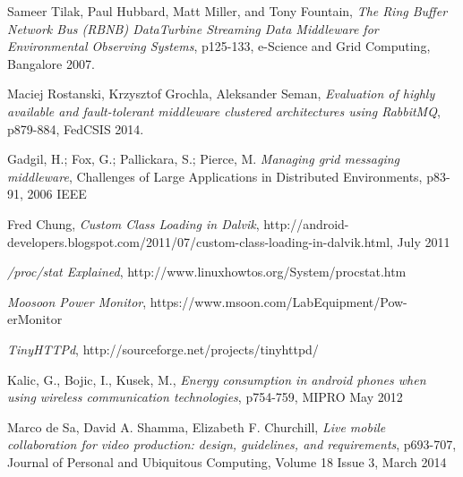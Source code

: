 \documentclass[conference]{IEEEtran}
\begin{document}

%
%
%
\begin{thebibliography}{100}

Sameer Tilak, Paul Hubbard, Matt Miller, and Tony Fountain, \emph{The Ring Buffer Network Bus (RBNB) DataTurbine Streaming Data Middleware for Environmental Observing Systems}, p125-133, e-Science and Grid Computing, Bangalore 2007.

Maciej Rostanski, Krzysztof Grochla, Aleksander Seman, \emph{Evaluation of highly available and fault-tolerant
middleware clustered architectures using RabbitMQ}, p879-884, FedCSIS 2014.

Gadgil, H.; Fox, G.; Pallickara, S.; Pierce, M. \emph{Managing grid messaging middleware}, Challenges of Large Applications in Distributed Environments, p83-91, 2006 IEEE

Fred Chung, \emph{Custom Class Loading in Dalvik}, http://android-developers.blogspot.com/2011/07/custom-class-loading-in-dalvik.html, July 2011

\emph{/proc/stat Explained}, http://www.linuxhowtos.org/System/procstat.htm

\emph{Moosoon Power Monitor}, https://www.msoon.com/LabEquipment/Pow-erMonitor

\emph{TinyHTTPd}, http://sourceforge.net/projects/tinyhttpd/


Kalic, G., Bojic, I., Kusek, M., \emph{Energy consumption in android phones when using wireless communication technologies}, p754-759, MIPRO May 2012

Marco de Sa, David A. Shamma, Elizabeth F. Churchill, \emph{Live mobile collaboration for video production: design, guidelines, and requirements}, p693-707, Journal of Personal and Ubiquitous Computing, Volume 18 Issue 3, March 2014


\end{thebibliography}
\end{document}
